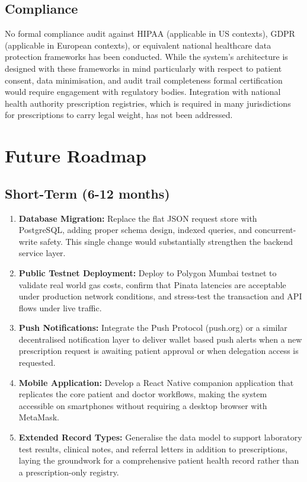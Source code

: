 \documentclass[12pt,a4wide]{report}
\begin{document}
\subsection{Compliance}

No formal compliance audit against HIPAA (applicable in US contexts), GDPR
(applicable in European contexts), or equivalent national healthcare data protection
frameworks has been conducted. While the system's architecture is designed with
these frameworks in mind particularly with respect to patient consent, data
minimisation, and audit trail completeness formal certification would require
engagement with regulatory bodies. Integration with national health authority
prescription registries, which is required in many jurisdictions for prescriptions
to carry legal weight, has not been addressed.

\section{Future Roadmap}

\subsection{Short-Term (6-12 months)}

\begin{enumerate}
  \item \textbf{Database Migration:} Replace the flat JSON request store with
    PostgreSQL, adding proper schema design, indexed queries, and concurrent-write
    safety. This single change would substantially strengthen the backend service layer.
  \item \textbf{Public Testnet Deployment:} Deploy to Polygon Mumbai testnet to
    validate real world gas costs, confirm that Pinata latencies are acceptable
    under production network conditions, and stress-test the transaction and API
    flows under live traffic.
  \item \textbf{Push Notifications:} Integrate the Push Protocol (push.org) or
    a similar decentralised notification layer to deliver wallet based push alerts
    when a new prescription request is awaiting patient approval or when delegation
    access is requested.
  \item \textbf{Mobile Application:} Develop a React Native companion application
    that replicates the core patient and doctor workflows, making the system
    accessible on smartphones without requiring a desktop browser with MetaMask.
  \item \textbf{Extended Record Types:} Generalise the data model to support
    laboratory test results, clinical notes, and referral letters in addition to
    prescriptions, laying the groundwork for a comprehensive patient health record
    rather than a prescription-only registry.
\end{enumerate}
\end{document}
